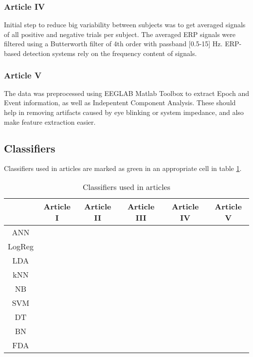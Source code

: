 \documentclass[10pt,journal,compsoc]{IEEEtran}
\begin{document}
\subsubsection*{Article IV}
Initial step to reduce big variability between subjects was to get averaged signals of all positive and negative trials per subject. The averaged ERP signals were filtered using a Butterworth filter of 4th order with passband [0.5-15] Hz. ERP-based detection systems rely on the frequency content of signals.

\subsubsection*{Article V}
The data was preprocessed using EEGLAB Matlab Toolbox to extract Epoch and Event information, as well as Indepentent Component Analysis. These should help in removing artifacts caused by eye blinking or system impedance, and also make feature extraction easier.

\subsection{Classifiers}
Classifiers used in articles are marked as green in an appropriate cell in table \ref{table_classifiers}.
\begin{table}[!t]
\renewcommand{\arraystretch}{1.3}
\caption{Classifiers used in articles}
\label{table_classifiers}
\centering
\setlength\tabcolsep{2pt}
\begin{tabular}{|c|c|c|c|c|c|}
\hline &Article I&Article II&Article III&Article IV&Article V\\\hline
ANN&&&\cellcolor{green}&\cellcolor{green}&\cellcolor{green}\\\hline
LogReg&&&&\cellcolor{green}&\\\hline
LDA&&&&\cellcolor{green}&\\\hline
kNN&&&\cellcolor{green}&\cellcolor{green}&\cellcolor{green}\\\hline
NB&&&&\cellcolor{green}&\\\hline
SVM&&\cellcolor{green}&\cellcolor{green}&\cellcolor{green}&\cellcolor{green}\\\hline
DT&&&&\cellcolor{green}&\\\hline
BN&&&\cellcolor{green}&&\cellcolor{green}\\\hline
FDA&\cellcolor{green}&&&&\\\hline
\end{tabular}
\end{table}
\end{document}
